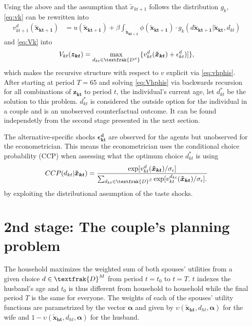 Using the above and the assumption that $\tilde{x}_{kt+1}$ follows the distribution $g_k$, \eqref{eq:vk} can be rewritten into
\begin{align}
v_{kt+1}^d(\boldsymbol{\tilde{x}_{kt+1}})&=u(\boldsymbol{\tilde{x}_{kt+1}}) +\beta \int_{\boldsymbol{\tilde{x}_{kt+1}}}{\phi(\boldsymbol{\tilde{x}_{kt+1}})\cdot g_k(d\boldsymbol{\tilde{x}_{kt+1}}|\boldsymbol{\tilde{x}_{kt}},d_{kt})}  
\label{eq:vhphis}
\end{align}
and \eqref{eq:Vk} into
\begin{align}
V_{kt}(\boldsymbol{z_{kt}})=\max_{d_{kt}\in \textfrak{D^S}} \{v_{kt}^d(\boldsymbol{\tilde{x}_{kt}})+\epsilon_{kt}^d)]\},
\label{eq:Vhphis}
\end{align}
which makes the recursive structure with respect to $v$ explicit via \eqref{eq:vhphis}. After starting at period $T=65$ and solving \eqref{eq:Vhphis} via backwards recursion for all combinations of $\boldsymbol{z_{kt}}$ to period $t$, the individual's current age, let $d_{kt}^*$ be the solution to this problem. $d_{kt}^*$ is considered the outside option for the individual in a couple and is an unobserved counterfactual outcome. It can be found independetly from the second stage presented in the next section. 

The alternative-specific shocks $\boldsymbol{\epsilon_{kt}^d}$ are observed for the agents but unobserved for the econometrician. This means the econometrician uses the conditional choice probability (CCP) when assessing what the optimum choice $d_{kt}^*$ is using
\begin{align*}
CCP(d_{kt}|\boldsymbol{\tilde{x}_{kt}})=\frac{\exp[v_{kt}^{d}(\boldsymbol{\tilde{x}_{kt}})/ \sigma_{\epsilon}]}{\sum_{d_{kt} \in \textfrak{D}^S} { \exp[v_{kt}^{d_{kt}}(\boldsymbol{\tilde{x}_{kt}})/ \sigma_{\epsilon}].  }}
\end{align*}
by exploiting the distributional assumption of the taste shocks. 

\section{2nd stage: The couple's planning problem}
The household maximizes the weighted sum of both spouses' utilities from a given choice $d\in\textfrak{D}^M$ from period $t=t_0$ to $t=T$. $t$ indexes the husband's age and $t_0$ is thus different from household to household while the final period $T$ is the same for everyone. The weights of each of the spouses' utility functions are parametrized by the vector $\boldsymbol{\alpha}$ and given by $\upsilon(\boldsymbol{\tilde{x}_{ht}},d_{ht},\boldsymbol{\alpha})$ for the wife and $1-\upsilon(\boldsymbol{\tilde{x}_{ht}},d_{ht},\boldsymbol{\alpha})$ for the husband. 

